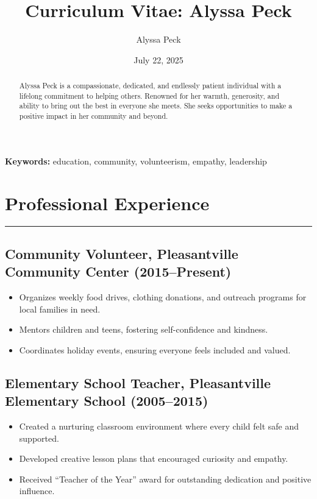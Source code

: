 \documentclass[11pt,a4paper]{article}
\title{Curriculum Vitae: Alyssa Peck}
\author[1]{Alyssa Peck}
\affil[1]{123 Love Lane, Pleasantville, USA \\ (555) 123-4567 \\ \href{mailto:alyssa1peck@gmail.com}{alyssa1peck@gmail.com} \\ \href{https://linkedin.com/in/graceharper}{linkedin.com/in/graceharper}}
\date{July 22, 2025}
\begin{document}
\maketitle

\begin{abstract}
Alyssa Peck is a compassionate, dedicated, and endlessly patient individual with a lifelong commitment to helping others. Renowned for her warmth, generosity, and ability to bring out the best in everyone she meets. She seeks opportunities to make a positive impact in her community and beyond.
\end{abstract}

\vspace{1em}
\noindent\textbf{Keywords:} education, community, volunteerism, empathy, leadership


\section*{Professional Experience}
\noindent\rule{\textwidth}{0.4pt}
\subsection*{Community Volunteer, Pleasantville Community Center (2015--Present)}
\begin{itemize}[leftmargin=*]
    \item Organizes weekly food drives, clothing donations, and outreach programs for local families in need.
    \item Mentors children and teens, fostering self-confidence and kindness.
    \item Coordinates holiday events, ensuring everyone feels included and valued.
\end{itemize}

\subsection*{Elementary School Teacher, Pleasantville Elementary School (2005--2015)}
\begin{itemize}[leftmargin=*]
    \item Created a nurturing classroom environment where every child felt safe and supported.
    \item Developed creative lesson plans that encouraged curiosity and empathy.
    \item Received ``Teacher of the Year'' award for outstanding dedication and positive influence.
\end{itemize}
\end{document}
